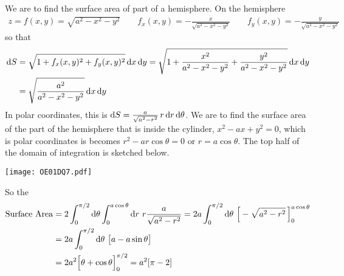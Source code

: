 \begin{solution}
We are to find the surface area of part of a hemisphere. On the hemisphere 
\begin{align*}
z=f(x,y)=\sqrt{a^2-x^2-y^2}\qquad 
f_x(x,y)=-\frac{x}{\sqrt{a^2-x^2-y^2}}\qquad
f_y(x,y)=-\frac{y}{\sqrt{a^2-x^2-y^2}}
\end{align*}
so that
\begin{align*}
\mathrm{d}S&=\sqrt{1+f_x(x,y)^2+f_y(x,y)^2}\,\mathrm{d}x\,\mathrm{d}y
=\sqrt{1+\frac{x^2}{a^2-x^2-y^2}+\frac{y^2}{a^2-x^2-y^2}}\,\mathrm{d}x\,\mathrm{d}y \\
&=\sqrt{\frac{a^2}{a^2-x^2-y^2}}\,\mathrm{d}x\,\mathrm{d}y
\end{align*}
In polar coordinates, this is $\mathrm{d}S=\frac{a}{\sqrt{a^2-r^2}}\,r\,\mathrm{d}r\,\mathrm{d}\theta$.
We are to find the surface area of the part of the hemisphere that is 
inside the cylinder, $x^2-ax+y^2=0$, which is polar coordinates is
becomes $r^2-ar\cos\theta=0$ or $r=a\cos\theta$. The top half of the domain of
integration is sketched below.  
\begin{center}
     \texttt{[image: OE01DQ7.pdf]}
\end{center}
So the
\begin{align*}
{\rm Surface\ Area}
&= 2\int_0^{\pi/2}\dee{\theta}\int_0^{a\cos\theta}\dee{r}\ r
                                      \frac{a}{\sqrt{a^2-r^2}}
= 2a\int_0^{\pi/2}\dee{\theta}\ \Big[-\sqrt{a^2-r^2}\,\Big]_0^{a\cos\theta}
\\
&= 2a\int_0^{\pi/2}\dee{\theta}\ \big[a-a\sin\theta\big] \\
&= 2a^2\Big[\theta+\cos\theta\Big]_0^{\pi/2}
=a^2[\pi-2]
\end{align*}
\end{solution}




